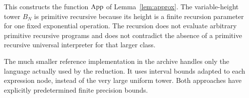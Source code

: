 This constructs the function $\operatorname{App}$ of Lemma~\ref{lem:approx}. The
variable-height tower $B_N$ is primitive recursive because its height is
a finite recursion parameter for one fixed exponential operation. The
recursion does not evaluate arbitrary primitive recursive programs and
does not contradict the absence of a primitive recursive universal
interpreter for that larger class.

The much smaller reference implementation in the archive handles only the
language actually used by the reduction. It uses interval bounds adapted
to each expression node, instead of the very large uniform tower. Both
approaches have explicitly predetermined finite precision bounds.
